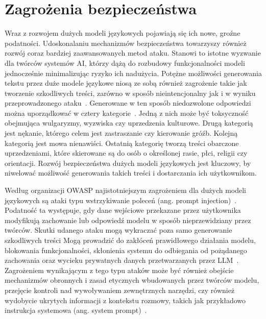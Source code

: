 \section{Zagrożenia bezpieczeństwa}
Wraz z rozwojem dużych modeli językowych pojawiają się ich nowe, groźne podatności. Udoskonalaniu mechanizmów bezpieczeństwa towarzyszy również rozwój coraz bardziej zaawansowanych metod ataku.
Stanowi to istotne wyzwanie dla twórców systemów AI, którzy dążą do rozbudowy funkcjonalności modeli jednocześnie minimalizując ryzyko ich nadużycia.
Potężne możliwości generowania tekstu przez duże modele językowe niosą ze sobą również zagrożenie takie jak tworzenie szkodliwych treści, zarówno w sposób nieintencjonalny jak i w wyniku przeprowadzonego ataku~\cite{zhang2025guardiansoffenderssurveyharmful}.
Generowane w ten sposób niedozwolone odpowiedzi można uporządkować w cztery kategorie~\cite{zhang2025guardiansoffenderssurveyharmful}.
Jedną z nich może być toksyczność obejmująca wulgaryzmy, wyzwiska czy uprzedzenia kulturowe. Drugą kategorią jest nękanie, którego celem jest zastraszanie czy kierowanie gróźb. Kolejną kategorią jest mowa nienawiści. Ostatnią kategorię tworzą treści obarczone uprzedzeniami, które skierowane są do osób o określonej rasie, płci, religii czy orientacji.
Rozwój bezpieczeństwa dużych modeli językowych jest kluczowy, by niwelować możliwość generowania takich treści i dostarczania ich użytkownikom.

Według organizacji OWASP najistotniejszym zagrożeniem dla dużych modeli językowych są ataki typu wstrzykiwanie poleceń (ang. prompt injection)~\cite{owasp_llm_top10}.
Podatność ta występuje, gdy dane wejściowe przekazane przez użytkownika modyfikują zachowanie lub odpowiedź modelu w sposób nieprzewidziany przez twórców.
Skutki udanego ataku mogą wykraczać poza samo generowanie szkodliwych treści
Mogą prowadzić do zakłóceń prawidłowego działania modelu, blokowania funkcjonalności, skłonienia systemu do odbiegania od pożądanego zachowania oraz wycieku prywatnych danych przetwarzanych przez LLM~\cite{nist_taxonomy_2025}.
Zagrożeniem wynikającym z tego typu ataków może być również obejście mechanizmów obronnych i zasad etycznych wbudowanych przez twórców modelu, przejęcie kontroli nad wywoływaniem zewnętrznych narzędzi, czy również wydobycie ukrytych informacji z kontekstu rozmowy, takich jak przykładowo instrukcja systemowa (ang. system prompt)~\cite{nist_taxonomy_2025}.